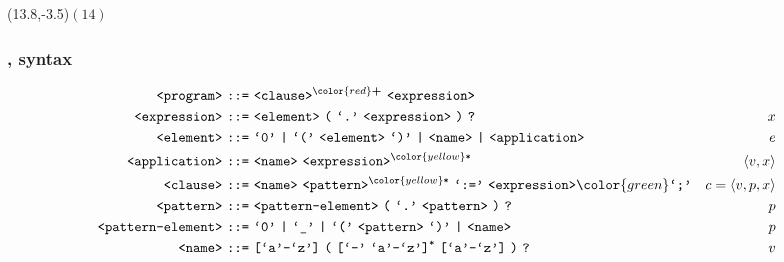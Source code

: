 \begin{frame}

\begin{textblock}{1}(13.8,-3.5)$(14)$\end{textblock}

\frametitle{\D{}, syntax}

\setcounter{equation}{0}

\begin{align*}
\nonterm{program}\ \textt{::=}&\ \nonterm{clause}^{\color{red}\textt{\bf +}}
\ \nonterm{expression}
& \\
\nonterm{expression}\ \textt{::=}&\ \nonterm{element}\ \textt{(}\ \term{.}
\ \nonterm{expression}\ \textt{)}\ \textt{?}
& x\\
\nonterm{element}\ \textt{::=}&\ \term{0}\ \textt{|}\ \term{(}
\ \nonterm{element}\ \term{)}\ \textt{|}\ \nonterm{name}\ \textt{|}
\ \nonterm{application}
& e\\
\nonterm{application}\ \textt{::=}&\ \nonterm{name}
\ \nonterm{expression}^{\color{yellow}\textt{*}}
& \left\langle v,x \right\rangle \\
\nonterm{clause}\ \textt{::=}&\ \nonterm{name}
\ \nonterm{pattern}^{\color{yellow}\textt{*}}\ \term{:=}
\ \nonterm{expression}{\color{green}\term{;}}
& c=\left\langle v, p, x \right\rangle \\
\nonterm{pattern}\ \textt{::=}&\ \nonterm{pattern-element}\ \textt{(}
\ \term{.}\ \nonterm{pattern}\ \textt{)}\ \textt{?}
& p\\
\nonterm{pattern-element}\ \textt{::=}&\ \term{0}\ \textt{|}\ \term{\_}
\ \textt{|}\ \term{(}\ \nonterm{pattern}\ \term{)}\ \textt{|}\ \nonterm{name}
& p\\
\nonterm{name}\ \textt{::=}&\ \textt{[}\term{a}\mathmono{-}\term{z}\textt{]}
\ \textt{(}\ \textt{[}\term{-}\ \term{a}\mathmono{-}\term{z}\textt{]}^\textt{*}
\ \textt{[}\term{a}\mathmono{-}\term{z}\textt{]}\ \textt{)}\ \textt{?}
& v
\end{align*}


\end{frame}
